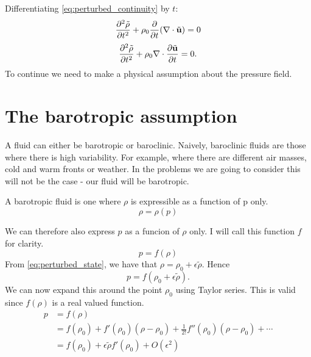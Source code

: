 Differentiating \eqref{eq:perturbed_continuity} by $t$:
    \begin{equation*}
        \frac{\partial ^2 \tilde{\rho}}{\partial t^2} + \rho_0 \frac{\partial }{\partial t}(\nabla \cdot \tilde{\mathbf{u}}) = 0 
    \end{equation*}
    \begin{equation}
        \frac{\partial ^2 \tilde{\rho}}{\partial t^2}
        + \rho_0 \nabla \cdot \frac{\partial \tilde{\mathbf{u}}}{\partial t} = 0. 
    \end{equation}
%
To continue we need to make a physical assumption about the pressure field.
%
\section{The barotropic assumption} \label{ss:barotropic_assumption}
A fluid can either be barotropic or baroclinic.
%
Naively, baroclinic fluids are those where there is high variability. For example, where there are different air masses, cold and warm fronts or weather. In the problems we are going to consider this will not be the case - our fluid will be barotropic. 
    \begin{defn} \cite{shames02mechanics} A barotropic fluid is one where $\rho$ is expressible as a function of p only.
        \[ \rho = \rho(p)
        \]
    \end{defn}
%
We can therefore also express $p$ as a funcion of $\rho$ only. I will call this function $f$ for clarity.
    \begin{equation}\label{eq:defn_f}
         p = f(\rho)
    \end{equation}
%
From \eqref{eq:perturbed_state}, we have that $\rho = \rho_0 + \epsilon \tilde{\rho}$. Hence
    \begin{equation*}
        p = f(\rho_0 + \epsilon\tilde{\rho}).
    \end{equation*}
%
We can now expand this around the point $\rho_0$ using Taylor series. This is valid since $f(\rho)$ is a real valued function. 
    \begin{align*}
        p &= f(\rho) \\
        & = f(\rho_0) + f'(\rho_0)(\rho - \rho_0) + \frac{1}{2!}f''(\rho_0)(\rho - \rho_0) + \dotsb \\
        &= f(\rho_0) + \epsilon \tilde{\rho}f'(\rho_0) + O(\epsilon^2)\\
    \end{align*}
